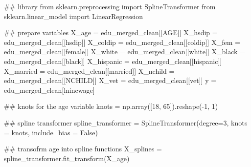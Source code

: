 \documentclass[
  letterpaper,
  DIV=11,
  numbers=noendperiod]{scrartcl}
\newenvironment{Shaded}{\begin{snugshade}}{\end{snugshade}}
\newcommand{\CommentTok}[1]{\textcolor[rgb]{0.37,0.37,0.37}{#1}}
\newcommand{\DecValTok}[1]{\textcolor[rgb]{0.68,0.00,0.00}{#1}}
\newcommand{\ImportTok}[1]{\textcolor[rgb]{0.00,0.46,0.62}{#1}}
\newcommand{\NormalTok}[1]{\textcolor[rgb]{0.00,0.23,0.31}{#1}}
\newcommand{\OperatorTok}[1]{\textcolor[rgb]{0.37,0.37,0.37}{#1}}
\newcommand{\StringTok}[1]{\textcolor[rgb]{0.13,0.47,0.30}{#1}}
\newcommand{\VariableTok}[1]{\textcolor[rgb]{0.07,0.07,0.07}{#1}}
\begin{document}
\begin{Shaded}
\begin{Highlighting}[]
\CommentTok{\#\# library}
\ImportTok{from}\NormalTok{ sklearn.preprocessing }\ImportTok{import}\NormalTok{ SplineTransformer}
\ImportTok{from}\NormalTok{ sklearn.linear\_model }\ImportTok{import}\NormalTok{ LinearRegression}

\CommentTok{\#\# prepare variables}
\NormalTok{X\_age }\OperatorTok{=}\NormalTok{ edu\_merged\_clean[[}\StringTok{\textquotesingle{}AGE\textquotesingle{}}\NormalTok{]]}
\NormalTok{X\_hsdip }\OperatorTok{=}\NormalTok{ edu\_merged\_clean[[}\StringTok{\textquotesingle{}hsdip\textquotesingle{}}\NormalTok{]]}
\NormalTok{X\_coldip }\OperatorTok{=}\NormalTok{ edu\_merged\_clean[[}\StringTok{\textquotesingle{}coldip\textquotesingle{}}\NormalTok{]]}
\NormalTok{X\_fem }\OperatorTok{=}\NormalTok{ edu\_merged\_clean[[}\StringTok{\textquotesingle{}female\textquotesingle{}}\NormalTok{]]}
\NormalTok{X\_white }\OperatorTok{=}\NormalTok{ edu\_merged\_clean[[}\StringTok{\textquotesingle{}white\textquotesingle{}}\NormalTok{]]}
\NormalTok{X\_black }\OperatorTok{=}\NormalTok{ edu\_merged\_clean[[}\StringTok{\textquotesingle{}black\textquotesingle{}}\NormalTok{]]}
\NormalTok{X\_hispanic }\OperatorTok{=}\NormalTok{ edu\_merged\_clean[[}\StringTok{\textquotesingle{}hispanic\textquotesingle{}}\NormalTok{]]}
\NormalTok{X\_married }\OperatorTok{=}\NormalTok{ edu\_merged\_clean[[}\StringTok{\textquotesingle{}married\textquotesingle{}}\NormalTok{]]}
\NormalTok{X\_nchild }\OperatorTok{=}\NormalTok{ edu\_merged\_clean[[}\StringTok{\textquotesingle{}NCHILD\textquotesingle{}}\NormalTok{]]}
\NormalTok{X\_vet }\OperatorTok{=}\NormalTok{ edu\_merged\_clean[[}\StringTok{\textquotesingle{}vet\textquotesingle{}}\NormalTok{]]}
\NormalTok{y }\OperatorTok{=}\NormalTok{ edu\_merged\_clean[}\StringTok{\textquotesingle{}lnincwage\textquotesingle{}}\NormalTok{]}

\CommentTok{\#\# knots for the age variable}
\NormalTok{knots }\OperatorTok{=}\NormalTok{ np.array([}\DecValTok{18}\NormalTok{, }\DecValTok{65}\NormalTok{]).reshape(}\OperatorTok{{-}}\DecValTok{1}\NormalTok{, }\DecValTok{1}\NormalTok{)}

\CommentTok{\#\# spline transformer}
\NormalTok{spline\_transformer }\OperatorTok{=}\NormalTok{ SplineTransformer(degree}\OperatorTok{=}\DecValTok{3}\NormalTok{, knots }\OperatorTok{=}\NormalTok{ knots, include\_bias }\OperatorTok{=} \VariableTok{False}\NormalTok{)}

\CommentTok{\#\# transofrm age into spline functions}
\NormalTok{X\_splines }\OperatorTok{=}\NormalTok{ spline\_transformer.fit\_transform(X\_age)}


\end{Highlighting}
\end{Shaded}
\end{document}
